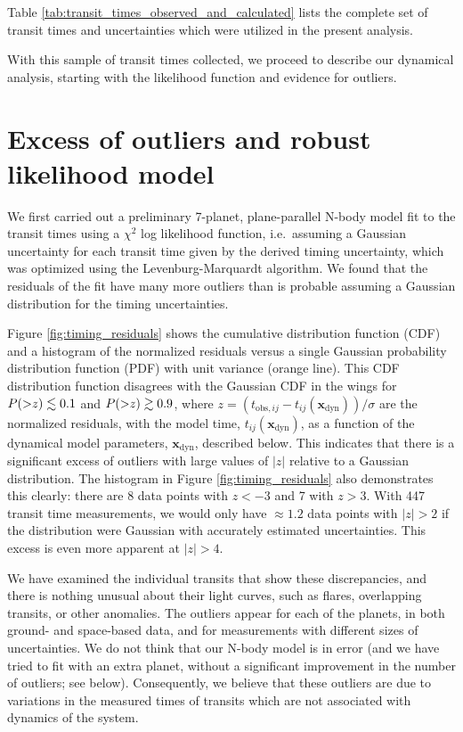 \documentclass[twocolumn]{aastex63}
\begin{document}
Table \ref{tab:transit_times_observed_and_calculated} lists the complete set
of transit times and uncertainties which were utilized in the present analysis.

With this sample of transit times collected, we proceed to describe our
dynamical analysis, starting with the likelihood function and evidence for outliers.

\section{Excess of outliers and robust likelihood model} \label{sec:outliers}

We first carried out a preliminary 7-planet, plane-parallel N-body model fit to the transit times using a $\chi^2$ log likelihood function, i.e.\ assuming a Gaussian uncertainty for each transit time given by the derived timing uncertainty, which was optimized using the Levenburg-Marquardt algorithm.
We found that the residuals of the fit have many more outliers than is probable assuming
a Gaussian distribution for the timing uncertainties.

Figure \ref{fig:timing_residuals} shows the cumulative distribution
function (CDF)
and a histogram of the normalized residuals versus a single Gaussian
probability distribution function (PDF) with unit variance (orange line).
This CDF distribution function disagrees with the Gaussian CDF
in the wings for $P({>}z) \lesssim 0.1$ and $P({>}z) \gtrsim 0.9$,
where $z {=} (t_{\mathrm{obs},ij} {-} t_{ij}(\mathbf{x}_\mathrm{dyn}))/\sigma$ are the normalized residuals, with the model time, $t_{ij}(\mathbf{x}_\mathrm{dyn})$, as a function of the dynamical model parameters, $\mathbf{x}_\mathrm{dyn}$, described below.
This indicates that there is a significant excess of outliers with
large values of $\vert z\vert$
relative to a Gaussian distribution.  The histogram in Figure
\ref{fig:timing_residuals} also demonstrates this clearly:  there
are 8 data points with $z {<} -3$ and 7 with $z {>} 3$.  With 447
transit time measurements, we would only have $\approx 1.2$ data points
with $\vert z\vert {>} 2$ if the distribution were Gaussian with accurately estimated
uncertainties.  This excess is even more apparent at
$\vert z \vert {>} 4$. %

We have examined the individual transits that show these discrepancies,
and there is nothing unusual about their light curves, such as flares,
overlapping transits, or other anomalies.  %
The outliers
appear for each of the planets, in both ground- and space-based data,
and for measurements with different sizes of uncertainties.  We do
not think that our N-body model is in error (and we have tried to fit
with an extra planet, without a significant improvement in the number
of outliers; see below).  Consequently, we believe that these outliers
are due to variations in the measured times of transits which are not
associated with dynamics of the system.
\end{document}
